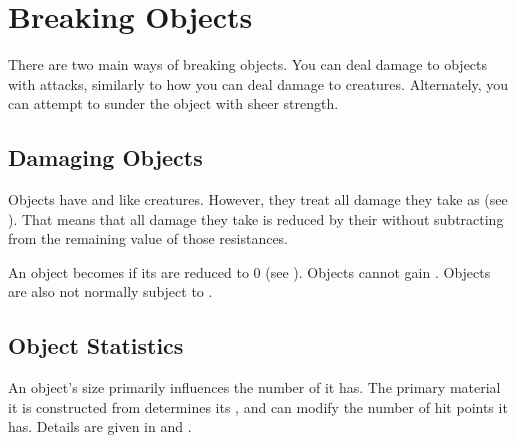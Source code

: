 \section{Breaking Objects}
    There are two main ways of breaking objects.
    You can deal damage to objects with attacks, similarly to how you can deal damage to creatures.
    Alternately, you can attempt to sunder the object with sheer strength.

    \subsection{Damaging Objects}
        Objects have  and  like creatures.
        However, they treat all damage they take as  (see ).
        That means that all damage they take is reduced by their  without subtracting from the remaining value of those resistances.

        An object becomes  if its  are reduced to 0 (see ).
        Objects cannot gain .
        Objects are also not normally subject to .

    \subsection{Object Statistics}
        An object's size primarily influences the number of  it has.
        The primary material it is constructed from determines its , and can modify the number of hit points it has.
        Details are given in  and .


